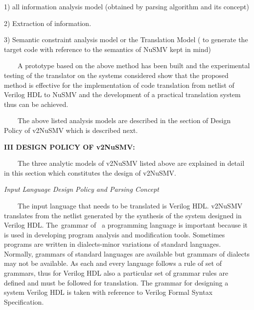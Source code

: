 \documentclass[a4paper]{article}
\begin{document}
{\color[rgb]{0.0,0.0,0.039215688}
\textrm{1) all information analysis model (obtained by parsing algorithm
and its concept)}}

{\color[rgb]{0.0,0.0,0.039215688}
\textrm{2) Extraction of information.}}

{\color[rgb]{0.0,0.0,0.039215688}
\textrm{3) Semantic constraint analysis model or the Translation Model (
to generate the target code with reference to the semantics of NuSMV
kept in mind)}}

{\color[rgb]{0.0,0.0,0.039215688}
\textrm{\ \ }\textrm{\ \ A prototype based on the above method has been
built and the experimental testing of the translator on the systems
considered show that the proposed method is effective for the
implementation of code translation from netlist of Verilog HDL to NuSMV
and the development of a practical translation system thus can be
achieved.}}

{\color[rgb]{0.0,0.0,0.039215688}
\textrm{\ \ }\textrm{\ \ The above listed analysis models are described
in the section of Design Policy of v2NuSMV which is described next.\ }}


\bigskip

{\color[rgb]{0.0,0.0,0.039215688}
\textrm{\textbf{III DESIGN POLICY OF v2NuSMV:\ }}}

{\color[rgb]{0.0,0.0,0.039215688}
\textrm{\ \ }\textrm{\ \ The three analytic models of v2NuSMV listed
above are explained in detail in this section which constitutes the
design of v2NuSMV.\ }}

{\color[rgb]{0.0,0.0,0.039215688}
\textrm{\textit{Input Language Design Policy and Parsing Concept\ }}}

{\color[rgb]{0.0,0.0,0.039215688}
\textrm{\ \ }\textrm{\ \ The input language that needs to be translated
is Verilog HDL. v2NuSMV translates from the netlist generated by the
synthesis of the system designed in Verilog HDL. The\ }\textrm{grammar
of \ a programming language is important because it is used in
developing program analysis and modification tools. Sometimes programs
are written in dialects-minor variations of standard languages.
Normally, grammars of standard languages are available but grammars of
dialects may not be available. As each and every language follows a
rule of set of grammars, thus for Verilog HDL also a particular set of
grammar rules are defined and must be followed for translation. The
grammar for designing a system Verilog HDL is taken with reference to
Verilog Formal Syntax Specification.\ }}
\end{document}
